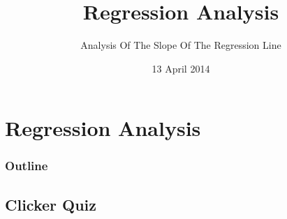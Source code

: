 
\section{Regression Analysis}

\title{Regression Analysis}
\subtitle{Analysis Of The Slope Of The Regression Line}

\date{13 April 2014}

\begin{frame}
  \titlepage
\end{frame}

\begin{frame}
  \frametitle{Outline}
  \tableofcontents[hideothersubsections,sectionstyle=show/hide]
\end{frame}


\subsection{Clicker Quiz}


